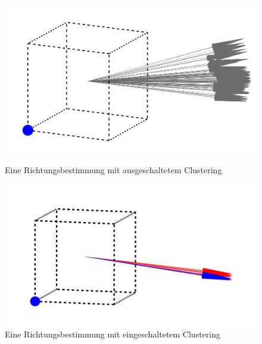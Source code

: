 \begin{figure}[H]
	\begin{minipage}[b]{0.45\textwidth}
		\centering
		\includegraphics[width=\textwidth]{img/ohne.png}
        \caption{Eine Richtungsbestimmung mit ausgeschaltetem Clustering\label{fig:ohne}}
	\end{minipage}
	\hfill
	\begin{minipage}[b]{0.45\textwidth}
		\centering
		\includegraphics[width=\textwidth]{img/mit.png}
        \caption{Eine Richtungsbestimmung mit eingeschaltetem Clustering\label{fig:mit}}
	\end{minipage}
\end{figure}